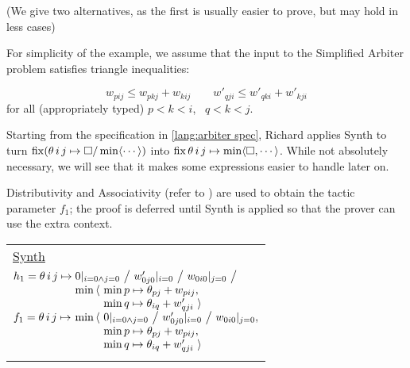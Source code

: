 (We give two alternatives, as the first is usually easier to prove, but may hold in less cases)

\newenvironment{tacticbox}[1]{\begin{center}\begin{tabular}{|@{~~~~}l@{~~~~}|}\hline\rule{0pt}{2.3ex}\underline{#1}\\[.4em]$}{$\\[-1em] \\[.3ex] \hline\end{tabular}\end{center}}

\noindent
\begin{minipage}{\columnwidth}
\exampleTitle \begin{comment}\subsection{Example}\end{comment}

For simplicity of the example, we assume that the input to the Simplified Arbiter problem
satisfies triangle inequalities:
\end{minipage}
%
\begin{equation}
w_{pij} \leq w_{pkj} + w_{kij} \qquad w'_{qji} \leq w'_{qki} + w'_{kji}
\label{equ:triangle}
\end{equation}
%
for all (appropriately typed) $p<k<i$, ~$q<k<j$.

\begin{comment}
\label{annex:more tactics} %
\end{comment}

\medskip
Starting from the specification in \eqref{lang:arbiter spec}, Richard applies Synth to turn
$\operatorname{fix} (\theta\,i\,j\mapsto\square/\min\langle\cdots\rangle)$ into $\operatorname{fix}\theta\,i\,j\mapsto\min\langle\square,\cdots\rangle$.
While not absolutely necessary, we will see that it makes some expressions easier to handle later
on.

Distributivity and Associativity (refer to ) are used to obtain the tactic parameter $f_1$;
the proof is deferred until Synth is applied so that the prover can use the extra context.

\begin{tacticbox}{Synth}
  \begin{array}{@{} l @{} l @{} l @{}}
       h_1=\theta\,i\,j\mapsto{}
	      & \lspan2{0|_{i=0\land j=0} ~\big/~ w'_{0j0}|_{i=0} ~\big/~ w_{0i0}|_{j=0} ~\big/~} \\
	      & \min\,\langle~ & \min p\mapsto\theta_{pj}+w_{pij}, \\
	      & & \min q\mapsto\theta_{iq}+w'_{qji} ~\rangle \\
       f_1=\theta\,i\,j\mapsto{}
	      & \min\,\langle~ & 0|_{i=0\land j=0} ~\big/~ w'_{0j0}|_{i=0} ~\big/~ w_{0i0}|_{j=0}, \\
	      & & \min p\mapsto\theta_{pj}+w_{pij}, \\
	      & & \min q\mapsto\theta_{iq}+w'_{qji} ~\rangle
  \end{array}
\end{tacticbox}

